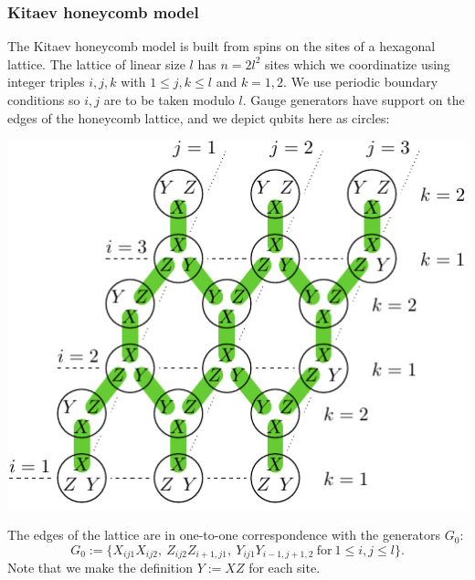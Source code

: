 
%

%
%



%

\subsubsection{Kitaev honeycomb model}




The Kitaev honeycomb model \cite{Kitaev2006} is built from spins on
the sites of a hexagonal lattice. 
The lattice of linear size $l$ has $n=2l^2$ sites
which we coordinatize using integer triples $i, j, k$
with $1\le j, k\le l$ and $k=1, 2.$
We use periodic boundary conditions so $i, j$ are
to be taken modulo $l$.
Gauge generators have support on the edges of the honeycomb lattice,
and we depict qubits here as circles:
\begin{center}
\includegraphics[width=0.6\columnwidth]{fig_00.pdf}
\end{center}
The edges of the lattice are in one-to-one
correspondence with the generators $G_0$:
$$
G_0 := \big\{X_{ij1}X_{ij2},\ Z_{ij2}Z_{i+1,j1},\ Y_{ij1}Y_{i-1,j+1,2}
\ \mbox{for}\ 1\le i,j\le l\big\}.
$$
Note that we make the definition $Y:=XZ$ for each site.

